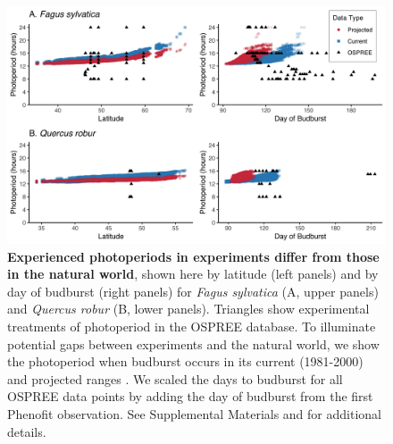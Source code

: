 \documentclass{article}
\begin{document}
 
\begin{figure}[p]
\includegraphics{..//..//analyses/photoperiod/figures/2D_actual_combined.png} 
\caption{\textbf{Experienced photoperiods in experiments differ from those in the natural world}, shown here by latitude (left panels) and by day of budburst (right panels) for \emph{Fagus sylvatica} (A, upper panels) and \emph{Quercus robur} (B, lower panels). Triangles show experimental treatments of photoperiod in the OSPREE database. To illuminate potential gaps between experiments and the natural world, we show the photoperiod when budburst occurs in its current (1981-2000) and projected ranges \citep[2081-2100, using the A1Fi Phenofit scenario, see][]{duputie2015}. We scaled the days to budburst for all OSPREE data points by adding the day of budburst from the first Phenofit observation. See Supplemental Materials and \citet{duputie2015} for additional details.} 
 \label{fig:fagus}
 \end{figure}
 
\end{document}
